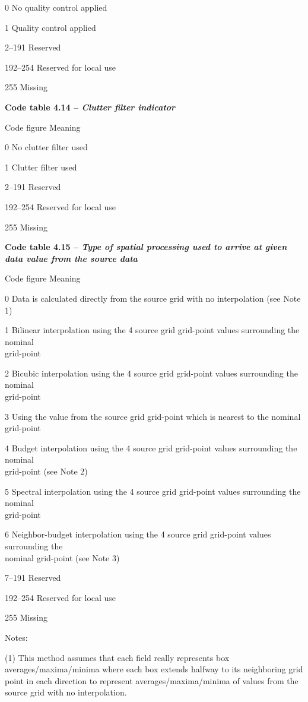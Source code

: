 0 No quality control applied

1 Quality control applied

2--191 Reserved

192--254 Reserved for local use

255 Missing

\textbf{Code table 4.14 -- \emph{Clutter filter indicator}}

Code figure Meaning

0 No clutter filter used

1 Clutter filter used

2--191 Reserved

192--254 Reserved for local use

255 Missing

\textbf{Code table 4.15 -- \emph{Type of spatial processing used to arrive at given data value from the source data}}

Code figure Meaning

0 Data is calculated directly from the source grid with no interpolation (see Note 1)

1 Bilinear interpolation using the 4 source grid grid-point values surrounding the nominal\\
grid-point

2 Bicubic interpolation using the 4 source grid grid-point values surrounding the nominal\\
grid-point

3 Using the value from the source grid grid-point which is nearest to the nominal grid-point

4 Budget interpolation using the 4 source grid grid-point values surrounding the nominal\\
grid-point (see Note 2)

5 Spectral interpolation using the 4 source grid grid-point values surrounding the nominal\\
grid-point

6 Neighbor-budget interpolation using the 4 source grid grid-point values surrounding the\\
nominal grid-point (see Note 3)

7--191 Reserved

192--254 Reserved for local use

255 Missing

Notes:

(1) This method assumes that each field really represents box averages/maxima/minima where each box extends halfway to its neighboring grid point in each direction to represent averages/maxima/minima of values from the source grid with no interpolation.

